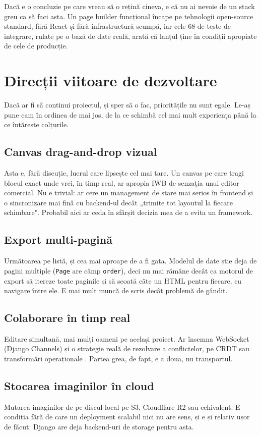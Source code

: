 \documentclass[12pt,a4paper]{report}
\begin{document}
Dacă e o concluzie pe care vreau să o rețină cineva, e că nu ai nevoie de un stack
greu ca să faci asta. Un page builder funcțional încape pe tehnologii open-source
standard, fără React și fără infrastructură scumpă, iar cele 68 de teste de
integrare, rulate pe o bază de date reală, arată că lanțul ține în condiții
apropiate de cele de producție.

\section{Direcții viitoare de dezvoltare}

Dacă ar fi să continui proiectul, și sper să o fac, prioritățile nu sunt egale.
Le-aș pune cam în ordinea de mai jos, de la ce schimbă cel mai mult experiența până la
ce întărește colțurile.

\subsection{Canvas drag-and-drop vizual}
Asta e, fără discuție, lucrul care lipsește cel mai tare. Un canvas pe care tragi
blocul exact unde vrei, în timp real, ar apropia IWB de senzația unui editor comercial.
Nu e trivial: ar cere un management de stare mai serios în frontend și o sincronizare
mai fină cu backend-ul decât „trimite tot layoutul la fiecare schimbare". Probabil aici
ar ceda în sfârșit decizia mea de a evita un framework.

\subsection{Export multi-pagină}
Următoarea pe listă, și cea mai aproape de a fi gata. Modelul de date știe deja de
pagini multiple (\texttt{Page} are câmp \texttt{order}), deci nu mai rămâne decât
ca motorul de export să itereze toate paginile și să scoată câte un HTML pentru fiecare,
cu navigare între ele. E mai mult muncă de scris decât problemă de gândit.

\subsection{Colaborare în timp real}
Editare simultană, mai mulți oameni pe același proiect. Ar însemna WebSocket (Django
Channels) și o strategie reală de rezolvare a conflictelor, pe CRDT sau transformări
operaționale \cite{shapiro2011}. Partea grea, de fapt, e a doua, nu transportul.

\subsection{Stocarea imaginilor în cloud}
Mutarea imaginilor de pe discul local pe S3, Cloudflare R2 sau echivalent. E condiția
fără de care un deployment scalabil nici nu are sens, și e și relativ ușor de făcut:
Django are deja backend-uri de storage pentru asta.
\end{document}
